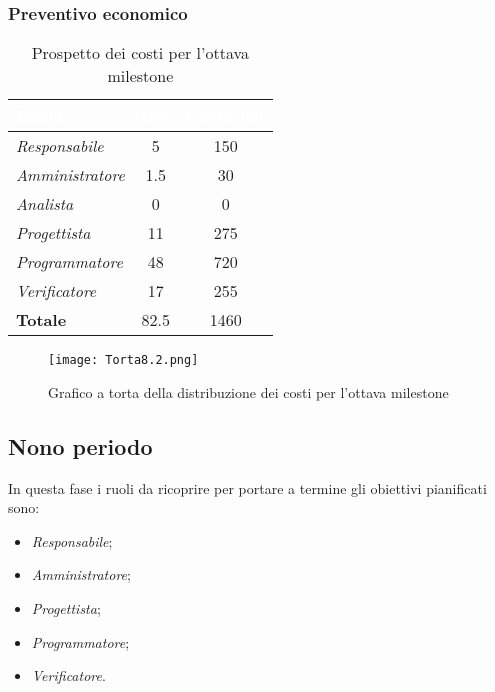 \newpage
\subsubsection{Preventivo economico}

\begin{table}[H]
    \renewcommand\arraystretch{1.5}
    \centering
    \begin{tabular}{|l|c|c|}
    \hline
    \rowcolor[HTML]{036400}
    \textcolor{white}{\textbf{Ruolo}} & \multicolumn{1}{l|}{\textcolor{white}{\textbf{Ore}}} & \multicolumn{1}{l|}{\textcolor{white}{\textbf{Costo (€)}}} \\ \hline
    \rowcolor[HTML]{EFEFEF}\textit{Responsabile}   & 5    & 150  \\ \hline
    \rowcolor[HTML]{C0C0C0}\textit{Amministratore} & 1.5  & 30   \\ \hline
    \rowcolor[HTML]{EFEFEF}\textit{Analista}       & 0    & 0    \\ \hline
    \rowcolor[HTML]{C0C0C0}\textit{Progettista}    & 11   & 275  \\ \hline
    \rowcolor[HTML]{EFEFEF}\textit{Programmatore}  & 48   & 720  \\ \hline
    \rowcolor[HTML]{C0C0C0}\textit{Verificatore}   & 17   & 255  \\ \hline
    \rowcolor[HTML]{EFEFEF}\textbf{Totale}         & 82.5 & 1460 \\ \hline
    \end{tabular}
    \caption{Prospetto dei costi per l'ottava milestone}
\end{table}

\begin{figure}[H]
    \texttt{[image: Torta8.2.png]}
    \caption{Grafico a torta della distribuzione dei costi per l'ottava milestone}
\end{figure}

\subsection{Nono periodo}

In questa fase i ruoli da ricoprire per portare a termine gli obiettivi pianificati sono:
\begin{itemize}
    \item \textit{Responsabile};
    \item \textit{Amministratore};
    \item \textit{Progettista};
    \item \textit{Programmatore};
    \item \textit{Verificatore}.
\end{itemize}

